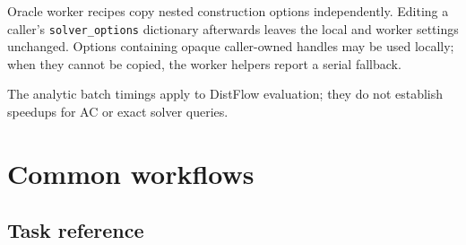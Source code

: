 \documentclass[11pt,a4paper]{report}
\newcommand{\code}[1]{\texttt{\small #1}}
\begin{document}
Oracle worker recipes copy nested construction options independently. Editing
a caller's \code{solver\_options} dictionary afterwards leaves the local and
worker settings unchanged. Options containing opaque caller-owned handles may
be used locally; when they cannot be copied, the worker helpers report a
serial fallback.

The analytic batch timings apply to DistFlow evaluation; they do not establish
speedups for AC or exact solver queries.

\chapter{Common workflows}
\label{ch:recipes}

\section{Task reference}
\end{document}
